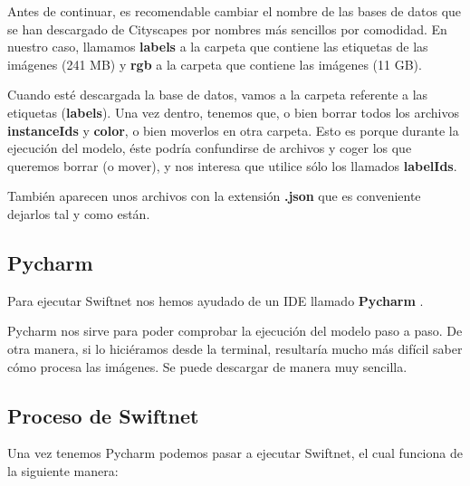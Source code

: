 Antes de continuar, es recomendable cambiar el nombre de las bases de datos que se han descargado de Cityscapes por nombres más sencillos por comodidad. En nuestro caso, llamamos \textbf{labels} a la carpeta que contiene las etiquetas de las imágenes (241 MB) y \textbf{rgb} a la carpeta que contiene las imágenes (11 GB).

Cuando esté descargada la base de datos, vamos a la carpeta referente a las etiquetas (\textbf{labels}). Una vez dentro, tenemos que, o bien borrar todos los archivos \textbf{instanceIds} y \textbf{color}, o bien moverlos en otra carpeta. Esto es porque durante la ejecución del modelo, éste podría confundirse de archivos y coger los que queremos borrar (o mover), y nos interesa que utilice sólo los llamados \textbf{labelIds}.

También aparecen unos archivos con la extensión \textbf{.json} que es conveniente dejarlos tal y como están.

\subsection{Pycharm}

Para ejecutar Swiftnet nos hemos ayudado de un \ac{IDE} llamado \textbf{Pycharm} \cite{pycharm}.

Pycharm nos sirve para poder comprobar la ejecución del modelo paso a paso. De otra manera, si lo hiciéramos desde la terminal, resultaría mucho más difícil saber cómo procesa las imágenes. Se puede descargar de manera muy sencilla.

\subsection{Proceso de Swiftnet}

Una vez tenemos Pycharm podemos pasar a ejecutar Swiftnet, el cual funciona de la siguiente manera:

